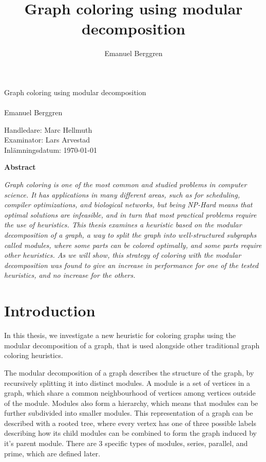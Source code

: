 \documentclass[a4paper]{article}
\author{Emanuel Berggren}
\title{Graph coloring using modular decomposition}
\newcommand{\Framsida}{\AddToShipoutPicture*{\put(0,0){\texttt{[image: kandidatfram.pdf]}}}}
\begin{document}
\sloppy
\Framsida 
\vspace*{4cm}
\Huge{Graph coloring using modular decomposition}\\\\ %
\Large{Emanuel Berggren} %

\vspace*{12cm}
\Large{Handledare: Marc Hellmuth} \\ 
\Large{Examinator: Lars Arvestad} \\ 
\Large{Inlämningsdatum: \today}\\

\newpage
\begin{center}
	\textbf{Abstract}
\end{center}
\textit{
Graph coloring is one of the most common and studied problems in computer
science. It has applications in many different areas, such as for scheduling,
compiler optimizations, and biological networks, but
being NP-Hard means that optimal solutions are infeasible, and in turn that most
practical problems require the use of heuristics. This thesis examines a
heuristic based on the modular decomposition of a graph, a way to split the graph
into well-structured subgraphs called modules, where some parts can be colored optimally,
and some parts require other heuristics. As we will show, this strategy of coloring with the
modular decomposition was found to give an increase in performance for one
of the tested heuristics, and no increase for the others.
}




\tableofcontents


\section{Introduction}


In this thesis, we investigate a new heuristic for coloring graphs using the
modular decomposition of a graph, that is used alongside other traditional
graph coloring heuristics.

The modular decomposition of a graph describes the structure of the graph, by
recursively splitting it into distinct modules. A module is a set of vertices
in a graph, which share a common neighbourhood of vertices among vertices
outside of the module. Modules also form a hierarchy, which means that modules
can be further subdivided into smaller modules. This representation of a graph
can be described with a rooted tree, where every vertex has one of three
possible labels describing how its child modules can be combined to form the
graph induced by it's parent module. There are 3 specific types of modules,
series, parallel, and prime, which are defined later.
\end{document}
